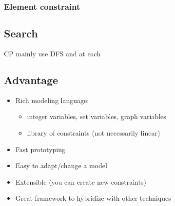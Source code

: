 \subsubsection{Element constraint}




\subsection{Search}

CP mainly use DFS and at each











\subsection{Advantage}
\begin{itemize}
    \item Rich modeling language:
        \begin{itemize}
            \item  integer variables, set variables, graph variables
            \item  library of constraints (not necessarily linear)
        \end{itemize}
    \item  Fast prototyping
    \item  Easy to adapt/change a model
    \item  Extensible (you can create new constraints)
    \item  Great framework to hybridize with other techniques
\end{itemize}


